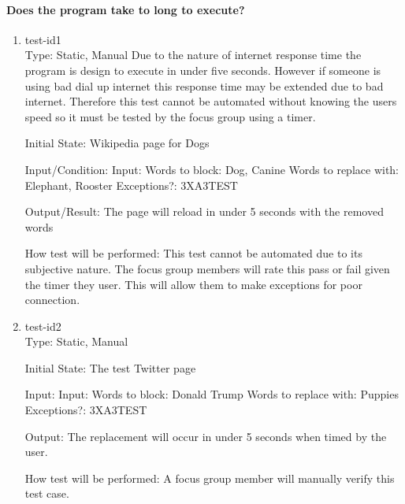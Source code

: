 \documentclass[12pt, titlepage]{article}
\begin{document}
\paragraph{Does the program take to long to execute?}
\begin{enumerate}
\item{test-id1\\}
Type: Static, Manual
 Due to the nature of internet response time the program is design to execute in under five seconds. However if someone is using bad dial up internet this response time may be extended due to bad internet. Therefore this test cannot be automated without knowing the users speed so it must be tested by the focus group using a timer.
					
Initial State: Wikipedia page for Dogs
					
Input/Condition: Input: Words to block: Dog, Canine
Words to replace with: Elephant, Rooster
Exceptions?: 3XA3TEST
					
Output/Result: The page will reload in under 5 seconds with the removed words
					
How test will be performed: This test cannot be automated due to its subjective nature. The focus group members will rate this pass or fail given the timer they user. This will allow them to make exceptions for poor connection.
					
\item{test-id2\\}
Type: Static, Manual
					
Initial State: The test Twitter page
					
Input:
Input:  Words to block: Donald Trump
Words to replace with: Puppies
Exceptions?: 3XA3TEST
					
Output: The replacement will occur in under 5 seconds when timed by the user.
					
How test will be performed: A focus group member will manually verify this test case.
\end{enumerate}
\end{document}
